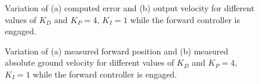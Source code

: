 \begin{figure}[H]
    \begin{minipage}[t]{0.5\linewidth}
        \centering
        \scalebox{0.55}{}
    \end{minipage}
    \begin{minipage}[t]{0.5\linewidth}
        \centering
        \scalebox{0.55}{}
    \end{minipage}
    \caption{Variation of (a) computed error and (b) output velocity for different values of $K_{D}$ and $K_P=4$, $K_I=1$ while the forward controller is engaged.}
    \label{fig:tune-fwd-der-io}
\end{figure}
\begin{figure}[H]
    \begin{minipage}[t]{0.5\linewidth}
        \centering
        \scalebox{0.55}{}
    \end{minipage}
    \begin{minipage}[t]{0.5\linewidth}
        \centering
        \scalebox{0.55}{}
    \end{minipage}
    \caption{Variation of (a) measured forward position and (b) measured absolute ground velocity for different values of $K_{D}$ and $K_P=4$, $K_I=1$ while the forward controller is engaged.}
    \label{fig:tune-fwd-der-measures}
\end{figure}